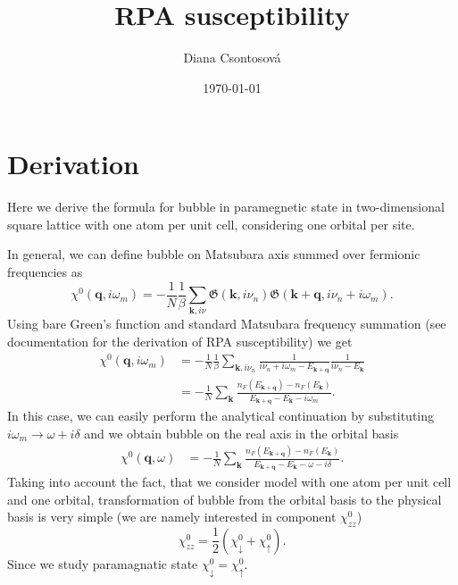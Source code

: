 \documentclass[preprint,prb,amsmath,superscriptaddress,showpacs]{revtex4}
\newcommand{\bk}{\mathbf{k}}
\newcommand{\bq}{\mathbf{q}}
\begin{document}
\title{RPA susceptibility}

\author{Diana Csontosová}

\date{\today}


\section{Derivation}

Here we derive the formula for bubble in paramegnetic state in
two-dimensional square lattice with one atom per unit cell,
considering one orbital per site.

In general, we can define bubble on Matsubara axis summed over
fermionic frequencies as
%
\begin{equation}
      \chi^0(\bq, i \omega_m) =
      - \frac{1}{N} \frac{1}{\beta} \sum_{\bk, i\nu} 
      \mathfrak{G}(\bk, i\nu_n)
      \mathfrak{G}(\bk + \bq, i\nu_{n} + i\omega_m).
\end{equation}
%
Using bare Green's function and standard Matsubara frequency summation
(see documentation for the derivation of RPA susceptibility) we get
%
\begin{equation}
  \begin{aligned}
  \chi^0(\bq, i \omega_m) &= - \frac{1}{N} \frac{1}{\beta} \sum_{\bk, i\nu_n} \frac{1}{i\nu_n +
    i\omega_m - E_{\bk + \bq}} \frac{1}{i\nu_n - E_{\bk}} \\
  &= - \frac{1}{N} \sum_{\bk} \frac{n_F (E_{\bk + \bq}) - n_F
    (E_{\bk})}{E_{\bk + \bq} - E_{\bk} - i\omega_m}.
  \end{aligned}
\end{equation}
In this case, we can easily perform the analytical continuation by
substituting $i\omega_m \rightarrow \omega + i\delta$ and we obtain
bubble on the real axis in the orbital basis
%
\begin{equation}
  \begin{aligned}
  \chi^0(\bq, \omega) &= - \frac{1}{N} \sum_{\bk} \frac{n_F (E_{\bk + \bq}) - n_F
    (E_{\bk})}{E_{\bk + \bq} - E_{\bk} - \omega - i\delta}.
  \end{aligned}
\end{equation}
%
Taking into account the fact, that we consider model with one atom per
unit cell and one orbital, transformation of bubble from the orbital basis to the physical
basis is very
simple (we are namely interested in component $\chi^0_{zz}$)
%
\begin{equation}
  \chi^0_{zz} = \frac{1}{2} \left(\chi^0_{\downarrow} +
    \chi^0_{\uparrow} \right).
\end{equation}
%
Since we study paramagnatic state $\chi^0_{\downarrow} = \chi^0_{\uparrow}$.
%
\end{document}
